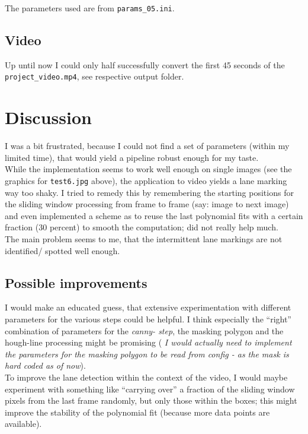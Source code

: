 \documentclass[a4paper]{article}
\begin{document}
The parameters used are from \texttt{params\_05.ini}.

\subsection{Video}
Up until now I could only half successfully convert the first 45 seconds of the
\texttt{project\_video.mp4}, see respective output folder.

\section{Discussion}
I was a bit frustrated, because I could not find a set of parameters (within
my limited time), that would yield a pipeline robust enough for my taste.
\\
While the implementation seems to work well enough on single images (see the
graphics for \texttt{test6.jpg} above), the application to video yields a
lane marking way too shaky. I tried to remedy this by remembering the starting
positions for the sliding window processing from frame to frame (say: image
to next image) and even implemented a scheme as to reuse the last polynomial
fits with a certain fraction (30 percent) to smooth the computation;
did not really help much.
\\
The main problem seems to me, that the intermittent lane markings are not
identified/ spotted well enough.

\subsection{Possible improvements}
I would make an educated guess, that extensive experimentation with different
parameters for the various steps could be helpful. I think especially the
\enquote{right} combination of parameters for the \textit{canny- step}, the
masking polygon and the hough-line processing might be promising (
\textit{I would actually need to implement the parameters for the masking
polygon to be read from config - as the mask is hard coded as of now}).
\\
To improve the lane detection within the context of the video, I would maybe
experiment with something like \enquote{carrying over} a fraction of the
sliding window pixels from the last frame randomly, but only those within the
boxes; this might improve the stability of the polynomial fit (because
more data points are available).
\end{document}
